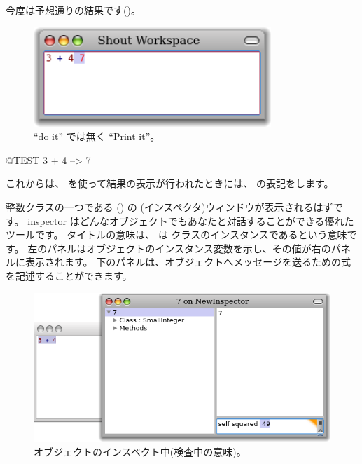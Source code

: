 \documentclass[a4paper,10pt,twoside]{book}
\begin{document}
今度は予想通りの結果です()。

\begin{figure}[htb]
\centerline {\includegraphics[width=0.8\textwidth]{PrintIt}}
\caption{``do it'' では無く ``Print it''。}
\end{figure}

\begin{code}{@TEST}
3 + 4 --> 7
\end{code}
\noindent
これからは、 を使って結果の表示が行われたときには、\ct{-->} の表記をします。

\noindent
整数クラスの一つである  () の (インスペクタ)ウィンドウが表示されるはずです。
inspector はどんなオブジェクトでもあなたと対話することができる優れたツールです。
タイトルの意味は、 は  クラスのインスタンスであるという意味です。
左のパネルはオブジェクトのインスタンス変数を示し、その値が右のパネルに表示されます。
下のパネルは、オブジェクトへメッセージを送るための式を記述することができます。

\begin{figure}[htb]
\centerline {\includegraphics[width=\textwidth]{InspectIt}}
\caption{オブジェクトのインスペクト中(検査中の意味)。 }
\end{figure}
\end{document}
